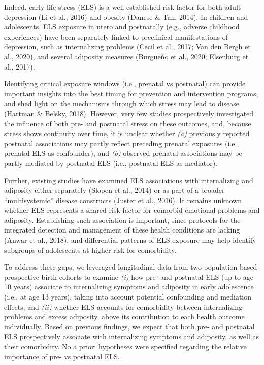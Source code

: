 \documentclass[
  letterpaper,
  DIV=11,
  numbers=noendperiod]{scrreport}
\begin{document}
Indeed, early-life stress (ELS) is a well-established risk factor for
both adult depression (Li et al., 2016) and obesity (Danese \& Tan,
2014). In children and adolescents, ELS exposure in utero and
postnatally (e.g., adverse childhood experiences) have been separately
linked to preclinical manifestations of depression, such as
internalizing problems (Cecil et al., 2017; Van den Bergh et al., 2020),
and several adiposity measures (Burgueño et al., 2020; Elsenburg et al.,
2017).

Identifying critical exposure windows (i.e., prenatal vs postnatal) can
provide important insights into the best timing for prevention and
intervention programs, and shed light on the mechanisms through which
stress may lead to disease (Hartman \& Belsky, 2018). However, very few
studies prospectively investigated the influence of both pre- and
postnatal stress on these outcomes, and, because stress shows continuity
over time, it is unclear whether \emph{(a)} previously reported
postnatal associations may partly reflect preceding prenatal exposures
(i.e., prenatal ELS as confounder), and \emph{(b)} observed prenatal
associations may be partly mediated by postnatal ELS (i.e., postnatal
ELS as mediator).

Further, existing studies have examined ELS associations with
internalizing and adiposity either separately (Slopen et al., 2014) or
as part of a broader ``multisystemic'' disease constructs (Juster et
al., 2016). It remains unknown whether ELS represents a shared risk
factor for comorbid emotional problems and adiposity. Establishing such
association is important, since protocols for the integrated detection
and management of these health conditions are lacking (Anwar et al.,
2018), and differential patterns of ELS exposure may help identify
subgroups of adolescents at higher risk for comorbidity.

To address these gaps, we leveraged longitudinal data from two
population-based prospective birth cohorts to examine \emph{(i)} how
pre- and postnatal ELS (up to age 10 years) associate to internalizing
symptoms and adiposity in early adolescence (i.e., at age 13 years),
taking into account potential confounding and mediation effects; and
\emph{(ii)} whether ELS accounts for comorbidity between internalizing
problems and excess adiposity, above its contribution to each health
outcome individually. Based on previous findings, we expect that both
pre- and postnatal ELS prospectively associate with internalizing
symptoms and adiposity, as well as their comorbidity. No a priori
hypotheses were specified regarding the relative importance of pre- vs
postnatal ELS.
\end{document}
